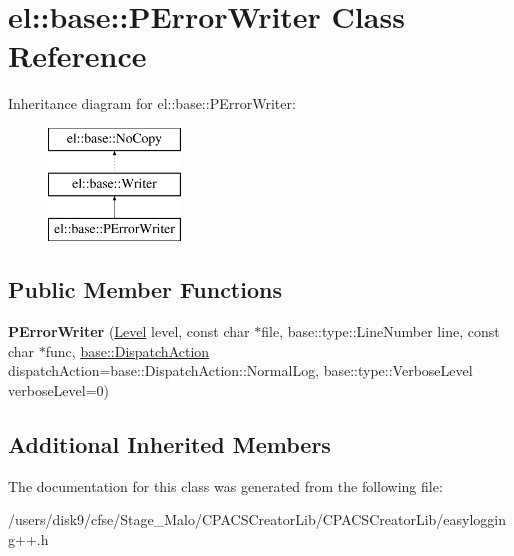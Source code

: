 \hypertarget{classel_1_1base_1_1PErrorWriter}{\section{el\-:\-:base\-:\-:P\-Error\-Writer Class Reference}
\label{classel_1_1base_1_1PErrorWriter}
}
Inheritance diagram for el\-:\-:base\-:\-:P\-Error\-Writer\-:\begin{figure}[H]
\begin{center}
\leavevmode
\includegraphics[height=3.000000cm]{classel_1_1base_1_1PErrorWriter}
\end{center}
\end{figure}
\subsection*{Public Member Functions}
\begin{DoxyCompactItemize}
\item 
\hypertarget{classel_1_1base_1_1PErrorWriter_a72c3ef41fd608b5f87ded491957e4c32}{{\bfseries P\-Error\-Writer} (\hyperlink{namespaceel_ab0ac6091262344c52dd2d3ad099e8e36}{Level} level, const char $\ast$file, base\-::type\-::\-Line\-Number line, const char $\ast$func, \hyperlink{namespaceel_1_1base_a3aa2563d38e47388ba242a1694fc2839}{base\-::\-Dispatch\-Action} dispatch\-Action=base\-::\-Dispatch\-Action\-::\-Normal\-Log, base\-::type\-::\-Verbose\-Level verbose\-Level=0)}\label{classel_1_1base_1_1PErrorWriter_a72c3ef41fd608b5f87ded491957e4c32}

\end{DoxyCompactItemize}
\subsection*{Additional Inherited Members}


The documentation for this class was generated from the following file\-:\begin{DoxyCompactItemize}
\item 
/users/disk9/cfse/\-Stage\-\_\-\-Malo/\-C\-P\-A\-C\-S\-Creator\-Lib/\-C\-P\-A\-C\-S\-Creator\-Lib/easylogging++.\-h\end{DoxyCompactItemize}
